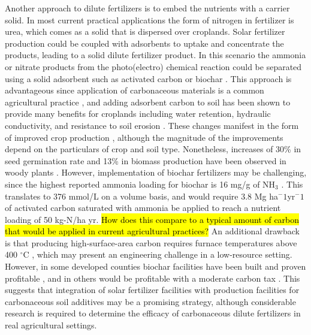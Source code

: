 Another approach to dilute fertilizers is to embed the nutrients with a carrier solid. In most current practical applications the form of nitrogen in fertilizer is urea, which comes as a solid that is dispersed over croplands. Solar fertilizer production could be coupled with adsorbents to uptake and concentrate the products, leading to a solid dilute fertilizer product. In this scenario the ammonia or nitrate products from the photo(electro) chemical reaction could be separated using a solid adsorbent such as activated carbon or biochar \cite{Gon_alves_2011}. This approach is advantageous since application of carbonaceous materials is a common agricultural practice \needcite, and adding adsorbent carbon to soil has been shown to provide many benefits for croplands including water retention, hydraulic conductivity, and resistance to soil erosion \cite{Li2018}. These changes manifest in the form of improved crop production \cite{Glaser2002}, although the magnitude of the improvements depend on the particulars of crop and soil type. Nonetheless, increases of 30\% in seed germination rate and 13\% in biomass production have been observed in woody plants \cite{Chidumayo_1994}. However, implementation of biochar fertilizers may be challenging, since the highest reported ammonia loading for biochar is 16 mg/g of NH$_3$ \cite{Gon_alves_2011}. This translates to 376 mmol/L on a volume basis, and would require 3.8 Mg ha$^-1$yr$^-1$ of activated carbon saturated with ammonia be applied to reach a nutrient loading of 50 kg-N/ha yr. \hl{How does this compare to a typical amount of carbon that would be applied in current agricultural practices?} An additional drawback is that producing high-surface-area carbon requires furnace temperatures above 400 $^\circ$C \cite{Lehmann2007}, which may present an engineering challenge in a low-resource setting. 
However, in some developed counties biochar facilities have been built and proven profitable \cite{McHenry2009}, and in others would be profitable with a moderate carbon tax \cite{Galinato2011}. This suggests that integration of solar fertilizer facilities with production facilities for carbonaceous soil additives may be a promising strategy, although considerable research is required to determine the efficacy of carbonaceous dilute fertilizers in real agricultural settings.

